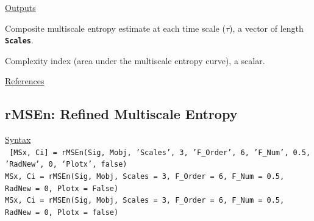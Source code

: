\documentclass[12pt, a4paper, titlepage, openany]{book}
\begin{document}
\noindent \ul{Outputs}
\begin{description}[labelsep=1cm, labelwidth=2cm, nosep, style=multiline,leftmargin=3cm]\footnotesize
\item[\texttt{MSx}]		Composite multiscale entropy estimate at each time scale ($\tau$), a vector of length 											\textbf{\texttt{Scales}}.
\item[\texttt{Ci}]		Complexity index (area under the multiscale entropy curve), a scalar.
\end{description}

\noindent \ul{References}\hspace{1cm}
\cite{MS1} \cite{MS2} \cite{MS3} \cite{cMS1} \cite{cMS2} 



\newpage
\subsection{\normalsize rMSEn: \hspace{15mm} Refined Multiscale Entropy}
\noindent\ul{Syntax} \vspace{6mm} \\ \noindent \texttt{\footnotesize
[MSx, Ci] = rMSEn(Sig, Mobj, 'Scales', 3, 'F\_Order', 6, 'F\_Num', 0.5, 'RadNew', 0, ‘Plotx’, false)\\
MSx, Ci = rMSEn(Sig, Mobj, Scales = 3, F\_Order = 6, F\_Num = 0.5, RadNew = 0, Plotx = False)\\ 
MSx, Ci = rMSEn(Sig, Mobj, Scales = 3, F\_Order = 6, F\_Num = 0.5, RadNew = 0, Plotx = false)}
\end{document}
